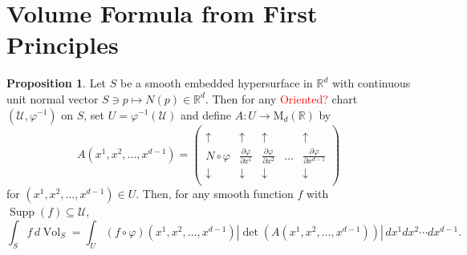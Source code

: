 \documentclass{article}
\theoremstyle{definition}
\newcommand\MdR{\mbox{M}_d(\mathbb{R})}
\newcommand\supp{\operatorname{Supp}}
\renewcommand\det{\operatorname{det}}
\newcommand{\p}{\partial}
\newcommand{\f}[2]{\frac{#1}{#2}}
\theoremstyle{theorem}
\newtheorem{proposition}[theorem]{Proposition}
\newcommand{\Vol}{\operatorname{Vol}}
\begin{document}
\section{Volume Formula from First Principles}




\begin{proposition}
Let $S$ be a smooth embedded hypersurface in $\mathbb{R}^d$ with continuous unit normal vector $S\ni p\mapsto N(p)\in \mathbb{R}^d$. Then for any \textcolor{red}{Oriented?} chart $(\mathcal{U},\varphi^{-1})$ on $S$, set $U=\varphi^{-1}(\mathcal{U})$ and define $A:U\to \MdR$ by
\begin{equation*}
A(x^1,x^2,\dots,x^{d-1})= 
\left(\begin{array}{c|cccc}
     & & &  &\\
    \uparrow &\uparrow & \uparrow &   &\uparrow \\ 
    N\circ \varphi &\f{\p \varphi}{\p x^1}& \f{\p \varphi}{\p x^2}  &\dots&\f{\p \varphi}{\p x^{d-1}}\\
    \downarrow  &\downarrow  & \downarrow &    &\downarrow \\ 
    &&& & 
    \end{array}\right)
\end{equation*}
for $(x^1,x^2,\dots,x^{d-1})\in U$. Then, for any smooth function $f$ with $\supp(f)\subseteq\mathcal{U}$,
\begin{equation*}
\int_S f\,d\Vol_S=\int_{U}(f\circ \varphi)(x^1,x^2,\dots,x^{d-1})|\det(A(x^1,x^2,\dots,x^{d-1}))|\,dx^1dx^2\cdots dx^{d-1}.
\end{equation*}
\end{proposition}
\end{document}
